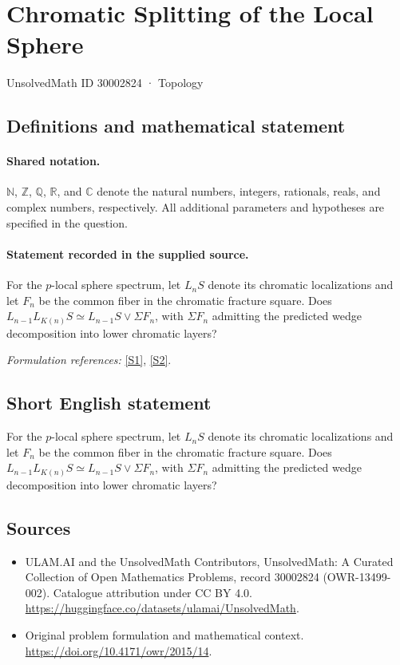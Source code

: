 \documentclass[11pt]{article}
\newcommand{\sref}[2]{\hyperlink{source:#1:#2}{[S#2]}}
\begin{document}
\setcounter{section}{30002823}
\section{Chromatic Splitting of the Local Sphere}\label{30002824}
{\small UnsolvedMath ID 30002824 · Topology}
\subsection{Definitions and mathematical statement}

\paragraph{Shared notation.}$\mathbb N$, $\mathbb Z$, $\mathbb Q$, $\mathbb R$, and $\mathbb C$ denote the natural numbers, integers, rationals, reals, and complex numbers, respectively. All additional parameters and hypotheses are specified in the question.


\paragraph{Statement recorded in the supplied source.}
For the $p$-local sphere spectrum, let $L_nS$ denote its chromatic localizations and let $F_n$ be the common fiber in the chromatic fracture square. Does $L_{n-1}L_{K(n)}S\simeq L_{n-1}S\vee\Sigma F_n$, with $\Sigma F_n$ admitting the predicted wedge decomposition into lower chromatic layers?
\par\smallskip\textit{Formulation references:} \sref{30002824}{1}, \sref{30002824}{2}.
\subsection{Short English statement}
For the $p$-local sphere spectrum, let $L_nS$ denote its chromatic localizations and let $F_n$ be the common fiber in the chromatic fracture square. Does $L_{n-1}L_{K(n)}S\simeq L_{n-1}S\vee\Sigma F_n$, with $\Sigma F_n$ admitting the predicted wedge decomposition into lower chromatic layers?
\subsection{Sources}
\begin{itemize}
\item[\hypertarget{source:30002824:1}{S1}] ULAM.AI and the UnsolvedMath Contributors, UnsolvedMath: A Curated Collection of Open Mathematics Problems, record 30002824 (OWR-13499-002). Catalogue attribution under CC BY 4.0.
\url{https://huggingface.co/datasets/ulamai/UnsolvedMath}.
\item[\hypertarget{source:30002824:2}{S2}] Original problem formulation and mathematical context.
\url{https://doi.org/10.4171/owr/2015/14}.
\end{itemize}
\label{end:30002824}
\end{document}

